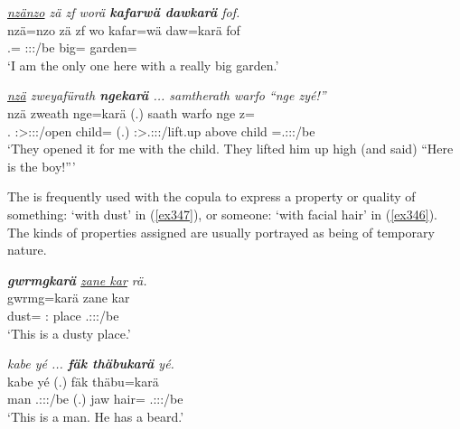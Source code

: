 \begin{exe}
	\ex \emph{\underline{nzänzo} zä zf worä \textbf{kafarwä dawkarä} fof.}\\
	\gll nzä=nzo zä zf wo kafar=wä daw=karä fof\\
	\Fsg.\Abs{}=\Only{} \Prox{} \Imm{} \Fsg:\Sbj:\Nonpast:\Ipfv/be big=\Emph{} garden=\Prop{} \Emph{}\\  
	\trans `I am the only one here with a really big garden.'
	\label{ex344}
\end{exe}
\begin{exe}
	\ex \emph{\underline{nzä} zweyafürath \textbf{ngekarä}  ... samtherath warfo ``nge zyé!''}\\
	\gll nzä zweath nge=karä (.) saath warfo nge z=\\
	\Fsg.\Abs{} \Stpl:\Sbj>\Fsg:\Io:\Pst:\Pfv/open child=\Prop{} (.) \Stpl:\Sbj>\Tsg.\Masc:\Obj:\Pst:\Pfv/lift.up above child \Prox=\Tsg.\Masc:\Sbj:\Nonpast:\Ipfv/be\\
	\trans `They opened it for me with the child. They lifted him up high (and said) ``Here is the boy!'''
	\label{ex345}
\end{exe}
	
The  is frequently used with the copula to express a property or quality of something: `with dust' in (\ref{ex347}), or someone: `with facial hair' in (\ref{ex346}). The kinds of properties assigned are usually portrayed as being of temporary nature.

\begin{exe}
	\ex \emph{\textbf{gwrmgkarä} \underline{zane kar} rä.}\\
	\gll gwrmg=karä zane kar \\
	dust=\Prop{} \Dem:\Prox{} place \Tsg.\F:\Sbj:\Nonpast:\Ipfv/be\\
	\trans `This is a dusty place.'
	\label{ex347}
\end{exe}
\begin{exe}
	\ex \emph{kabe yé ... \textbf{fäk thäbukarä} yé.}\\
	\gll kabe yé (.) fäk thäbu=karä \\
	man \Tsg.\Masc:\Sbj:\Nonpast:\Ipfv/be (.) jaw hair=\Prop{} \Tsg.\Masc:\Sbj:\Nonpast:\Ipfv/be\\
	\trans `This is a man. He has a beard.'
	\label{ex346}
\end{exe}

